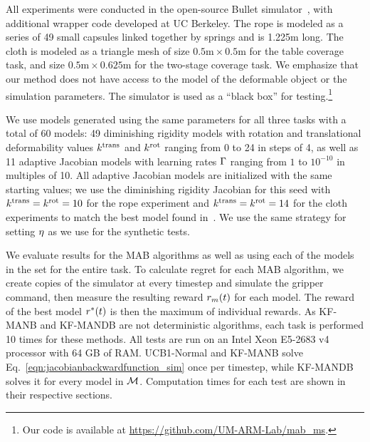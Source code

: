 All experiments were conducted in the open-source Bullet simulator~\cite{Coumans2010}, with additional wrapper code developed at UC Berkeley. The rope is modeled as a series of 49 small capsules linked together by springs and is 1.225m long. The cloth is modeled as a triangle mesh of size $0.5\text{m} \times 0.5\text{m}$ for the table coverage task, and size $0.5\text{m} \times 0.625\text{m}$ for the two-stage coverage task. We emphasize that our method does not have access to the model of the deformable object or the simulation parameters. The simulator is used as a ``black box'' for testing.\footnote{Our code is available at \url{https://github.com/UM-ARM-Lab/mab_ms}.}

We use models generated using the same parameters for all three tasks with a total of 60 models: 49 diminishing rigidity models with rotation and translational deformability values $k^{\textrm{trans}}$ and $k^{\textrm{rot}}$ ranging from 0 to 24 in steps of 4, as well as 11 adaptive Jacobian models with learning rates $\Gamma$ ranging from $1$ to $10^{-10}$ in multiples of 10. All adaptive Jacobian models are initialized with the same starting values; we use the diminishing rigidity Jacobian for this seed with $k^{\textrm{trans}}=k^{\textrm{rot}}=10$ for the rope experiment and $k^{\textrm{trans}}=k^{\textrm{rot}}=14$ for the cloth experiments to match the best model found in~\cite{Berenson2013}. We use the same strategy for setting $\eta$ as we use for the synthetic tests. 

We evaluate results for the MAB algorithms as well as using each of the models in the set for the entire task. To calculate regret for each MAB algorithm, we create copies of the simulator at every timestep and simulate the gripper command, then measure the resulting reward $r_m(t)$ for each model. The reward of the best model $r^*(t)$ is then the maximum of individual rewards. As KF-MANB and KF-MANDB are not deterministic algorithms, each task is performed 10 times for these methods. All tests are run on an Intel Xeon E5-2683 v4 processor with 64 GB of RAM. UCB1-Normal and KF-MANB solve Eq.~\eqref{eqn:jacobianbackwardfunction_sim} once per timestep, while KF-MANDB solves it for every model in $\mathcal{M}$. Computation times for each test are shown in their respective sections.


